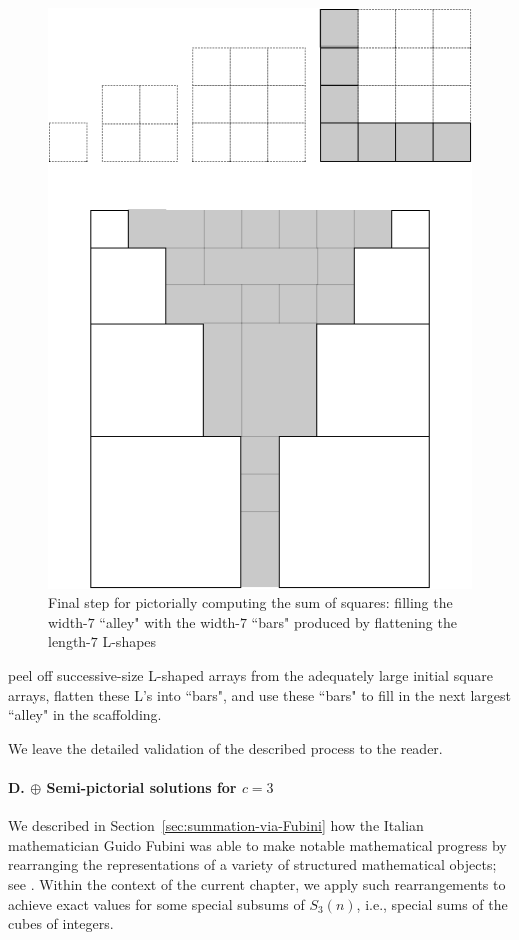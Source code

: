 \begin{figure}[ht]
\begin{center}
       \includegraphics[scale=0.3]{FiguresMaths/SumSquares5}
\caption{Final step for pictorially computing the sum of squares: filling the width-$7$ ``alley" with the width-$7$ ``bars" produced by flattening the length-$7$ L-shapes}
       \label{fig:sumSquares5}
\end{center}
\end{figure}
peel off successive-size L-shaped arrays from the adequately large initial square arrays, flatten these L's into ``bars", and use these ``bars" to fill in the next largest ``alley" in the scaffolding.

\medskip

We leave the detailed validation of the described process to the reader.

\paragraph{D. $\oplus$ Semi-pictorial solutions for $c=3$}

We described in Section~\ref{sec:summation-via-Fubini} how the Italian mathematician Guido Fubini was able to make notable mathematical progress by rearranging the representations of a variety of structured mathematical objects; see \cite{Fubini}.  Within the context of the current chapter, we apply such rearrangements to achieve exact values for some special subsums of $S_3(n)$, i.e., special sums of the cubes of integers.

